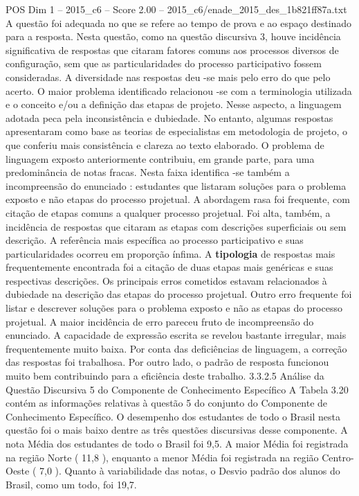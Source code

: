 \begin{textsample}{POS Dim 1 – 2015\_c6 – Score 2.00 – 2015\_c6/enade\_2015\_des\_1b821ff87a.txt}
A questão foi adequada no que se refere ao tempo de prova e ao espaço destinado para a resposta.
Nesta questão, como na questão discursiva 3, houve incidência significativa de respostas que citaram fatores comuns aos processos diversos de configuração, sem que as particularidades do processo participativo fossem consideradas.
A diversidade nas respostas deu -se mais pelo erro do que pelo acerto.
O maior problema identificado relacionou -se com a terminologia utilizada e o conceito e/ou a definição das etapas de projeto.
Nesse aspecto, a linguagem adotada peca pela inconsistência e dubiedade.
No entanto, algumas respostas apresentaram como base as teorias de especialistas em metodologia de projeto, o que conferiu mais consistência e clareza ao texto elaborado.
O problema de linguagem exposto anteriormente contribuiu, em grande parte, para uma predominância de notas fracas.
Nesta faixa identifica -se também a incompreensão do enunciado : estudantes que listaram soluções para o problema exposto e não etapas do processo projetual.
A abordagem rasa foi frequente, com citação de etapas comuns a qualquer processo projetual.
Foi alta, também, a incidência de respostas que citaram as etapas com descrições superficiais ou sem descrição.
A referência mais específica ao processo participativo e suas particularidades ocorreu em proporção ínfima.
A \textbf{tipologia} de respostas mais frequentemente encontrada foi a citação de duas etapas mais genéricas e suas respectivas descrições.
Os principais erros cometidos estavam relacionados à dubiedade na descrição das etapas do processo projetual.
Outro erro frequente foi listar e descrever soluções para o problema exposto e não as etapas do processo projetual.
A maior incidência de erro pareceu fruto de incompreensão do enunciado.
A capacidade de expressão escrita se revelou bastante irregular, mais frequentemente muito baixa.
Por conta das deficiências de linguagem, a correção das respostas foi trabalhosa.
Por outro lado, o padrão de resposta funcionou muito bem contribuindo para a eficiência deste trabalho. 3.3.2.5 Análise da Questão Discursiva 5 do Componente de Conhecimento Específico A Tabela 3.20 contém as informações relativas à questão 5 do conjunto do Componente de Conhecimento Específico.
O desempenho dos estudantes de todo o Brasil nesta questão foi o mais baixo dentre as três questões discursivas desse componente.
A nota Média dos estudantes de todo o Brasil foi 9,5.
A maior Média foi registrada na região Norte ( 11,8 ), enquanto a menor Média foi registrada na região Centro-Oeste ( 7,0 ).
Quanto à variabilidade das notas, o Desvio padrão dos alunos do Brasil, como um todo, foi 19,7.

\end{textsample}
